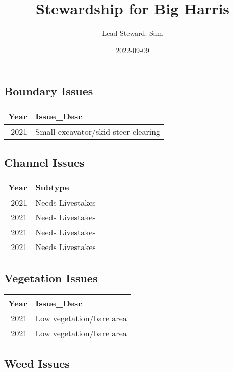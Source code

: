 \documentclass[
  landscape]{article}
\title{Stewardship for Big Harris}
\author{Lead Steward: Sam}
\date{2022-09-09}
\begin{document}
\maketitle

\hypertarget{boundary-issues}{%
\subsection{Boundary Issues}\label{boundary-issues}}

\begin{longtable}[]{@{}rl@{}}
\toprule()
Year & Issue\_Desc \\
\midrule()
\endhead
2021 & Small excavator/skid steer clearing \\
\bottomrule()
\end{longtable}

\hypertarget{channel-issues}{%
\subsection{Channel Issues}\label{channel-issues}}

\begin{longtable}[]{@{}rl@{}}
\toprule()
Year & Subtype \\
\midrule()
\endhead
2021 & Needs Livestakes \\
2021 & Needs Livestakes \\
2021 & Needs Livestakes \\
2021 & Needs Livestakes \\
\bottomrule()
\end{longtable}

\hypertarget{vegetation-issues}{%
\subsection{Vegetation Issues}\label{vegetation-issues}}

\begin{longtable}[]{@{}rl@{}}
\toprule()
Year & Issue\_Desc \\
\midrule()
\endhead
2021 & Low vegetation/bare area \\
2021 & Low vegetation/bare area \\
\bottomrule()
\end{longtable}

\hypertarget{weed-issues}{%
\subsection{Weed Issues}\label{weed-issues}}
\end{document}
